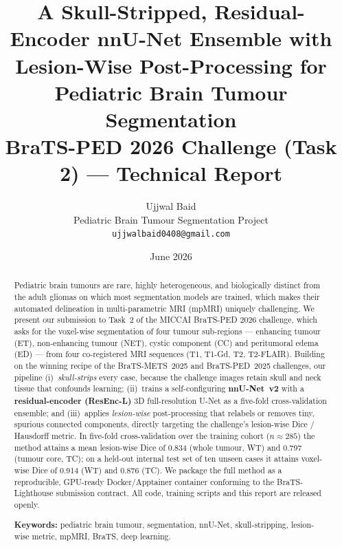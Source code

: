 \documentclass[11pt,a4paper]{article}
\title{\vspace{-1.0cm}\textbf{\color{brain}A Skull-Stripped, Residual-Encoder nnU-Net Ensemble with
Lesion-Wise Post-Processing for Pediatric Brain Tumour Segmentation}\\[0.3cm]
\large BraTS-PED 2026 Challenge (Task 2) --- Technical Report}
\author{Ujjwal Baid\\\small Pediatric Brain Tumour Segmentation Project\\\small \texttt{ujjwalbaid0408@gmail.com}}
\date{June 2026}
\newcommand{\result}[2]{#2}
\begin{document}
\maketitle
\thispagestyle{fancy}

\begin{abstract}
\noindent
Pediatric brain tumours are rare, highly heterogeneous, and biologically distinct
from the adult gliomas on which most segmentation models are trained, which makes
their automated delineation in multi-parametric MRI (mpMRI) uniquely challenging.
We present our submission to Task~2 of the MICCAI BraTS-PED 2026 challenge, which
asks for the voxel-wise segmentation of four tumour sub-regions ---
enhancing tumour (ET), non-enhancing tumour (NET), cystic component (CC) and
peritumoral edema (ED) --- from four co-registered MRI sequences (T1, T1-Gd, T2,
T2-FLAIR). Building on the winning recipe of the BraTS-METS~2025 and BraTS-PED~2025
challenges, our pipeline (i)~\emph{skull-strips} every case, because the
challenge images retain skull and neck tissue that confounds learning;
(ii)~trains a self-configuring \textbf{nnU-Net~v2} with a \textbf{residual-encoder
(ResEnc-L)} 3D full-resolution U-Net as a five-fold cross-validation ensemble; and
(iii)~applies \emph{lesion-wise} post-processing that relabels or removes tiny,
spurious connected components, directly targeting the challenge's lesion-wise
Dice / Hausdorff metric. In five-fold cross-validation over the training cohort
($n\!\approx\!285$) the method attains a mean lesion-wise Dice of
\result{WT}{0.834} (whole tumour, WT) and \result{TC}{0.797} (tumour core, TC); on a
held-out internal test set of ten unseen cases it attains voxel-wise Dice of
\result{WT}{0.914} (WT) and \result{TC}{0.876} (TC). We package the full method as a
reproducible, GPU-ready Docker/Apptainer container conforming to the
BraTS-Lighthouse submission contract. All code, training scripts and this report are
released openly.

\vspace{0.2cm}
\noindent\textbf{Keywords:} pediatric brain tumour, segmentation, nnU-Net,
skull-stripping, lesion-wise metric, mpMRI, BraTS, deep learning.
\end{abstract}

\tableofcontents
\vspace{0.4cm}
\end{document}
